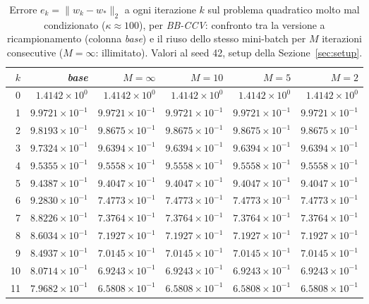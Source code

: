\begin{table}[H]
\centering
\footnotesize
\renewcommand{\arraystretch}{0.85}
\setlength{\tabcolsep}{4pt}
\caption{Errore $e_k=\|w_k-w_*\|_2$ a ogni iterazione $k$ sul problema quadratico molto mal condizionato ($\kappa\approx 100$), per \emph{BB-CCV}: confronto tra la versione a ricampionamento (colonna \emph{base}) e il riuso dello stesso mini-batch per $M$ iterazioni consecutive ($M=\infty$: illimitato). Valori al seed 42, setup della Sezione~\ref{sec:setup}.}
\label{tab:riuso_veryill_bb}
\begin{tabular}{@{}rrrrrr@{}}
\toprule
$k$ & \emph{base} & $M{=}\infty$ & $M{=}10$ & $M{=}5$ & $M{=}2$\\
\midrule
0 & $1.4142\times10^{0}$ & $1.4142\times10^{0}$ & $1.4142\times10^{0}$ & $1.4142\times10^{0}$ & $1.4142\times10^{0}$\\
1 & $9.9721\times10^{-1}$ & $9.9721\times10^{-1}$ & $9.9721\times10^{-1}$ & $9.9721\times10^{-1}$ & $9.9721\times10^{-1}$\\
2 & $9.8193\times10^{-1}$ & $9.8675\times10^{-1}$ & $9.8675\times10^{-1}$ & $9.8675\times10^{-1}$ & $9.8675\times10^{-1}$\\
3 & $9.7324\times10^{-1}$ & $9.6394\times10^{-1}$ & $9.6394\times10^{-1}$ & $9.6394\times10^{-1}$ & $9.6394\times10^{-1}$\\
4 & $9.5355\times10^{-1}$ & $9.5558\times10^{-1}$ & $9.5558\times10^{-1}$ & $9.5558\times10^{-1}$ & $9.5558\times10^{-1}$\\
5 & $9.4387\times10^{-1}$ & $9.4047\times10^{-1}$ & $9.4047\times10^{-1}$ & $9.4047\times10^{-1}$ & $9.4047\times10^{-1}$\\
6 & $9.2830\times10^{-1}$ & $7.4773\times10^{-1}$ & $7.4773\times10^{-1}$ & $7.4773\times10^{-1}$ & $7.4773\times10^{-1}$\\
7 & $8.8226\times10^{-1}$ & $7.3764\times10^{-1}$ & $7.3764\times10^{-1}$ & $7.3764\times10^{-1}$ & $7.3764\times10^{-1}$\\
8 & $8.6034\times10^{-1}$ & $7.1927\times10^{-1}$ & $7.1927\times10^{-1}$ & $7.1927\times10^{-1}$ & $7.1927\times10^{-1}$\\
9 & $8.4937\times10^{-1}$ & $7.0145\times10^{-1}$ & $7.0145\times10^{-1}$ & $7.0145\times10^{-1}$ & $7.0145\times10^{-1}$\\
10 & $8.0714\times10^{-1}$ & $6.9243\times10^{-1}$ & $6.9243\times10^{-1}$ & $6.9243\times10^{-1}$ & $6.9243\times10^{-1}$\\
11 & $7.9682\times10^{-1}$ & $6.5808\times10^{-1}$ & $6.5808\times10^{-1}$ & $6.5808\times10^{-1}$ & $6.5808\times10^{-1}$\\

\end{tabular}
\end{table}
